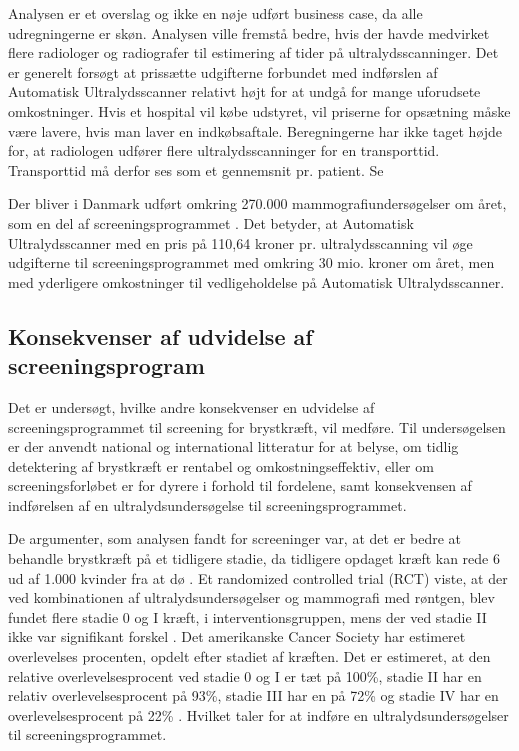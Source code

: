 Analysen er et overslag og ikke en nøje udført business case, da alle udregningerne er skøn. Analysen ville fremstå bedre, hvis der havde medvirket flere radiologer og radiografer til estimering af tider på ultralydsscanninger. Det er generelt forsøgt at prissætte udgifterne forbundet med indførslen af Automatisk Ultralydsscanner relativt højt for at undgå for mange uforudsete omkostninger. Hvis et hospital vil købe udstyret, vil priserne for opsætning måske være lavere, hvis man laver en indkøbsaftale. Beregningerne har ikke taget højde for, at radiologen udfører flere ultralydsscanninger for en transporttid. Transporttid må derfor ses som et gennemsnit pr. patient. Se 

Der bliver i Danmark udført omkring 270.000 mammografiundersøgelser om året, som en del af screeningsprogrammet \cite{esundhed}. Det betyder, at Automatisk Ultralydsscanner med en pris på 110,64 kroner pr. ultralydsscanning vil øge udgifterne til screeningsprogrammet med omkring 30 mio. kroner om året, men med yderligere omkostninger til vedligeholdelse på Automatisk Ultralydsscanner. 

\subsection{Konsekvenser af udvidelse af screeningsprogram} 
Det er undersøgt, hvilke andre konsekvenser en udvidelse af screeningsprogrammet til screening for brystkræft, vil medføre. Til undersøgelsen er der anvendt national og international litteratur for at belyse, om tidlig detektering af brystkræft er rentabel og omkostningseffektiv, eller om screeningsforløbet er for dyrere i forhold til fordelene, samt konsekvensen af indførelsen af en ultralydsundersøgelse til screeningsprogrammet. 

De argumenter, som analysen fandt for screeninger var, at det er bedre at behandle brystkræft på et tidligere stadie, da tidligere opdaget kræft kan rede 6 ud af 1.000 kvinder fra at dø \cite{Argumenter}. Et randomized controlled trial (RCT) viste, at der ved kombinationen af ultralydsundersøgelser og mammografi med røntgen, blev fundet flere stadie 0 og I kræft, i interventionsgruppen, mens der ved stadie II ikke var signifikant forskel \cite{Japan}. 
Det amerikanske Cancer Society har estimeret overlevelses procenten, opdelt efter stadiet af kræften. Det er estimeret, at den relative overlevelsesprocent ved stadie 0 og I er tæt på 100\%, stadie II har en relativ overlevelsesprocent på 93\%, stadie III har en på 72\% og stadie IV har en overlevelsesprocent på 22\% \cite{CancerSociety}. Hvilket taler for at indføre en ultralydsundersøgelser til screeningsprogrammet. 

